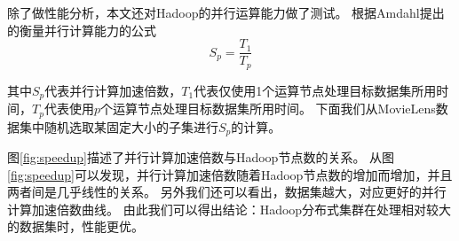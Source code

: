 除了做性能分析，本文还对Hadoop的并行运算能力做了测试。
根据Amdahl\supercite{Amdahl1967Validity}提出的衡量并行计算能力的公式
\begin{equation}
S_p = \frac{T_1}{T_p}
\end{equation}

其中$S_p$代表并行计算加速倍数，$T_1$代表仅使用1个运算节点处理目标数据集所用时间，$T_p$代表使用$p$个运算节点处理目标数据集所用时间。
下面我们从MovieLens数据集中随机选取某固定大小的子集进行$S_p$的计算。
\begin{center}
\pgfplotsset{width=9cm,compat=1.13}
\label{fig:speedup}
\end{center}

图\ref{fig:speedup}描述了并行计算加速倍数与Hadoop节点数的关系。
从图\ref{fig:speedup}可以发现，并行计算加速倍数随着Hadoop节点数的增加而增加，并且两者间是几乎线性的关系。
另外我们还可以看出，数据集越大，对应更好的并行计算加速倍数曲线。
由此我们可以得出结论：Hadoop分布式集群在处理相对较大的数据集时，性能更优。